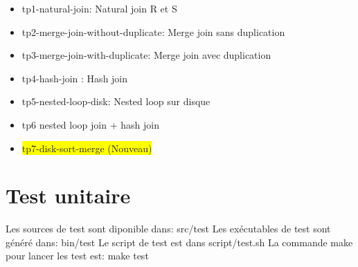 \documentclass[a4paper]{article}
\begin{document}
\begin{itemize}
  \item tp1-natural-join: Natural join R et S
  \item tp2-merge-join-without-duplicate: Merge join sans duplication
  \item tp3-merge-join-with-duplicate: Merge join avec duplication
  \item tp4-hash-join : Hash join
  \item tp5-nested-loop-disk: Nested loop sur disque
  \item tp6 nested loop join + hash join
  \item \colorbox{yellow}{tp7-disk-sort-merge (Nouveau)}
\end{itemize}

\section{Test unitaire}

Les sources de test sont diponible dans: src/test
Les exécutables de test sont généré dans: bin/test
Le script de test est dans script/test.sh
La commande make pour lancer les test est: make test
\end{document}
